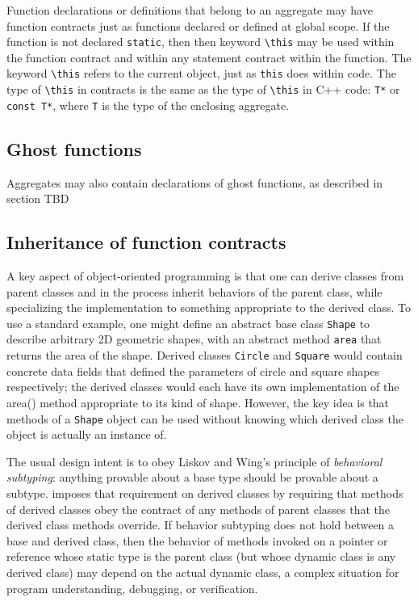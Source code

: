 Function declarations or definitions that belong to an aggregate may have function
contracts just as functions declared or defined at global scope. If the function is not declared \lstinline|static|, then
then keyword \lstinline|\this| may be used within the function
contract and within any statement contract within the 
function. The keyword \lstinline|\this| refers to the current
object, just as \lstinline|this| does within \lang code.
The type of \lstinline|\this| in contracts is the same as the type of \lstinline|\this| in C++ code: \lstinline|T*| or \lstinline|const T*|, where \lstinline|T| is the type of the enclosing aggregate.

\subsection{Ghost functions}
Aggregates may also contain declarations of ghost functions, as described in section TBD 


\subsection{Inheritance of function contracts}

A key aspect of object-oriented programming is 
that one can derive classes from parent classes and in 
the process inherit behaviors of the parent class, 
while specializing the implementation to something appropriate to the derived class. 
To use a standard example, 
one might define an abstract base class \lstinline|Shape| to describe arbitrary 2D geometric shapes, 
with an abstract method 
\lstinline|area| that returns the area of the shape. 
Derived classes \lstinline|Circle| and \lstinline|Square| would contain concrete data fields that defined the parameters of circle and square shapes respectively; 
the derived classes would each have its own implementation of the area() method appropriate to its kind of shape. 
However, the key idea is that methods of a \lstinline|Shape| object can be used without knowing which derived class the object is actually an instance of.

The usual design intent is to obey Liskov and Wing's principle of \textit{behavioral subtyping}\cite{Liskov:1994:BNS:197320.197383}: 
anything provable about a base type should be provable about a subtype.
\NAME{} imposes that requirement on derived classes by 
requiring that methods of derived classes obey the contract of any methods of parent classes that the derived class methods override. 
If behavior subtyping does not hold between a base and derived class, then the behavior of methods
invoked on a pointer or reference whose static type is the
parent class (but whose dynamic class is any derived class) may depend on the actual dynamic class, 
a complex situation for program understanding, debugging, or verification.


